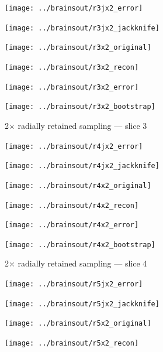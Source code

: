 \documentclass[article]{jdssv}
\begin{document}
\begin{appendix}
\begin{figure}
\begin{centering}
\parbox{\imsize}{\texttt{[image: ../brainsout/r3jx2\_error]}}
\parbox{\imsize}{\texttt{[image: ../brainsout/r3jx2\_jackknife]}}

\vspace{\vertsep}

\parbox{\imsize}{\texttt{[image: ../brainsout/r3x2\_original]}}
\parbox{\imsize}{\texttt{[image: ../brainsout/r3x2\_recon]}}

\vspace{\vertsep}

\parbox{\imsize}{\texttt{[image: ../brainsout/r3x2\_error]}}
\parbox{\imsize}{\texttt{[image: ../brainsout/r3x2\_bootstrap]}}

\end{centering}
\caption{2$\times$ radially retained sampling --- slice 3}
\end{figure}


\begin{figure}
\begin{centering}

\parbox{\imsize}{\texttt{[image: ../brainsout/r4jx2\_error]}}
\parbox{\imsize}{\texttt{[image: ../brainsout/r4jx2\_jackknife]}}

\vspace{\vertsep}

\parbox{\imsize}{\texttt{[image: ../brainsout/r4x2\_original]}}
\parbox{\imsize}{\texttt{[image: ../brainsout/r4x2\_recon]}}

\vspace{\vertsep}

\parbox{\imsize}{\texttt{[image: ../brainsout/r4x2\_error]}}
\parbox{\imsize}{\texttt{[image: ../brainsout/r4x2\_bootstrap]}}

\end{centering}
\caption{2$\times$ radially retained sampling --- slice 4}
\end{figure}


\begin{figure}
\begin{centering}

\parbox{\imsize}{\texttt{[image: ../brainsout/r5jx2\_error]}}
\parbox{\imsize}{\texttt{[image: ../brainsout/r5jx2\_jackknife]}}

\vspace{\vertsep}

\parbox{\imsize}{\texttt{[image: ../brainsout/r5x2\_original]}}
\parbox{\imsize}{\texttt{[image: ../brainsout/r5x2\_recon]}}

\vspace{\vertsep}


\end{centering}
\end{figure}
\end{appendix}
\end{document}
